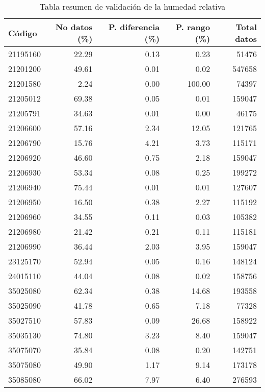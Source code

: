 \documentclass[11pt]{article}
\begin{document}
\begin{table}[H]
\begin{center}


\begin{tabular}{lrrrr}
\toprule
      Código &  No datos (\%) &  P. diferencia (\%) &  P. rango (\%) & Total datos \\
\midrule
 21195160 &     22.29 &           0.13 &      0.23 &         51476 \\
 21201200 &     49.61 &           0.01 &      0.02 &        547658 \\
 21201580 &      2.24 &           0.00 &    100.00 &         74397 \\
 21205012 &     69.38 &           0.05 &      0.01 &        159047 \\
 21205791 &     34.63 &           0.01 &      0.00 &         46175 \\
 21206600 &     57.16 &           2.34 &     12.05 &        121765 \\
 21206790 &     15.76 &           4.21 &      3.73 &        115171 \\
 21206920 &     46.60 &           0.75 &      2.18 &        159047 \\
 21206930 &     53.34 &           0.08 &      0.25 &        199272 \\
 21206940 &     75.44 &           0.01 &      0.01 &        127607 \\
 21206950 &     16.50 &           0.38 &      2.27 &        115192 \\
 21206960 &     34.55 &           0.11 &      0.03 &        105382 \\
 21206980 &     21.42 &           0.21 &      0.11 &        115181 \\
 21206990 &     36.44 &           2.03 &      3.95 &        159047 \\
 23125170 &     52.94 &           0.05 &      0.16 &        148124 \\
 24015110 &     44.04 &           0.08 &      0.02 &        158756 \\
 35025080 &     62.34 &           0.38 &     14.68 &        193558 \\
 35025090 &     41.78 &           0.65 &      7.18 &         77328 \\
 35027510 &     57.83 &           0.09 &     26.68 &        158922 \\
 35035130 &     74.80 &           3.23 &      8.40 &        159047 \\
 35075070 &     35.84 &           0.08 &      0.20 &        142751 \\
 35075080 &     49.90 &           1.17 &      9.14 &        173178 \\
 35085080 &     66.02 &           7.97 &      6.40 &        276593 \\
\bottomrule
\end{tabular}
		\caption{Tabla resumen de validación de la humedad relativa}
		\label{tabla:val_humedad}
\end{center}
\end{table}
\end{document}

